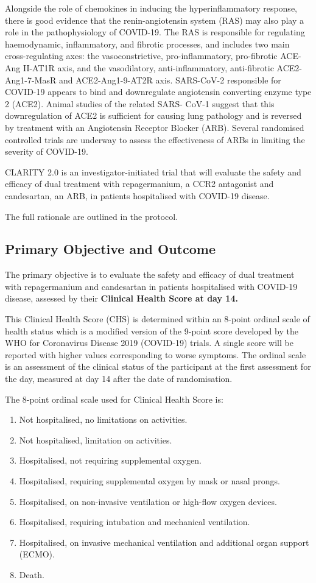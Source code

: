 \documentclass[11pt,parskip=half-]{scrartcl}
\begin{document}
Alongside the role of chemokines in inducing the hyperinflammatory response, there is good evidence that the renin-angiotensin system (RAS) may also play a role in the pathophysiology of COVID-19. The RAS is responsible for regulating haemodynamic, inflammatory, and fibrotic processes, and includes two main cross-regulating axes: the vasoconstrictive, pro-inflammatory, pro-fibrotic ACE-Ang II-AT1R axis, and the vasodilatory, anti-inflammatory, anti-fibrotic ACE2-Ang1-7-MasR and ACE2-Ang1-9-AT2R axis. SARS-CoV-2 responsible for COVID-19 appears to bind and downregulate angiotensin converting enzyme type 2 (ACE2). Animal studies of the related SARS- CoV-1 suggest that this downregulation of ACE2 is sufficient for causing lung pathology and is reversed by treatment with an Angiotensin Receptor Blocker (ARB). Several randomised controlled trials are underway to assess the effectiveness of ARBs in limiting the severity of COVID-19.

CLARITY 2.0 is an investigator-initiated trial that will evaluate the safety and efficacy of dual treatment with repagermanium, a CCR2 antagonist and candesartan, an ARB, in patients hospitalised with COVID-19 disease.


The full rationale are outlined in the protocol. 


\subsection{Primary Objective and Outcome}
The primary objective is to evaluate the safety and efficacy of dual treatment with repagermanium and candesartan in patients hospitalised with COVID-19 disease, assessed by their \textbf{Clinical Health Score at day 14.}

This Clinical Health Score (CHS) is determined within an 8-point ordinal scale of health status which is a modified version of the 9-point score developed by the WHO for Coronavirus Disease 2019 (COVID-19) trials. A single score will be reported with higher values corresponding to worse symptoms. The ordinal scale is an assessment of the clinical status of the participant at the first assessment for the day, measured at day 14 after the date of randomisation.

The 8-point ordinal scale used for Clinical Health Score is:
\begin{enumerate}[nolistsep]
    \item Not hospitalised, no limitations on activities.
    \item Not hospitalised, limitation on activities.
    \item Hospitalised, not requiring supplemental oxygen.
    \item Hospitalised, requiring supplemental oxygen by mask or nasal prongs.
    \item  Hospitalised, on non-invasive ventilation or high-flow oxygen devices.
    \item Hospitalised, requiring intubation and mechanical ventilation.
    \item Hospitalised, on invasive mechanical ventilation and additional organ support (ECMO).
    \item Death.
\end{enumerate}
\end{document}
